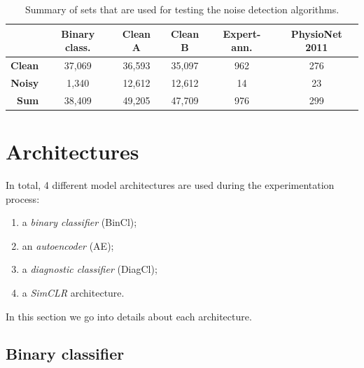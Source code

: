 \documentclass[a4paper,10pt]{article}
\begin{document}
\begin{table}[htbp]
	\centering
	\begin{tabular}{r|c|c|c|c|c}
		               & \textbf{Binary class.} & \textbf{Clean A} & \textbf{Clean B} & \textbf{Expert-ann.} & \textbf{PhysioNet 2011} \\ \midrule
		\textbf{Clean} & 37,069                 & 36,593           & 35,097           & 962                  & 276                     \\
		\textbf{Noisy} & 1,340                  & 12,612           & 12,612           & 14                   & 23                      \\ \midrule
		\textbf{Sum}   & 38,409                 & 49,205           & 47,709           & 976                  & 299
	\end{tabular}
	\caption{Summary of sets that are used for testing the noise detection algorithms.}
	\label{tab:all-noise-test}
\end{table}

\section{Architectures}
\label{sec:architectures}

In total, 4 different model architectures are used during the experimentation process:
\begin{enumerate}
	\item a \emph{binary classifier} (BinCl);
	\item an \emph{autoencoder} (AE);
	\item a \emph{diagnostic classifier} (DiagCl);
	\item a \emph{SimCLR} architecture.
\end{enumerate}
In this section we go into details about each architecture.

\subsection{Binary classifier}
\label{sec:bincl_architecture}
\end{document}
